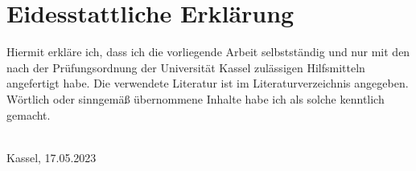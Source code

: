 \section*{Eidesstattliche Erklärung}

Hiermit erkläre ich, dass ich die vorliegende Arbeit selbstständig und nur mit den nach der Prüfungsordnung der Universität Kassel zulässigen Hilfsmitteln angefertigt habe.
Die verwendete Literatur ist im Literaturverzeichnis angegeben.
Wörtlich oder sinngemäß übernommene Inhalte habe ich als solche kenntlich gemacht.

\vspace{1cm}



\begin{flushright}
  \underline{\hspace{7cm}} \\
  Kassel, 17.05.2023
\end{flushright}
